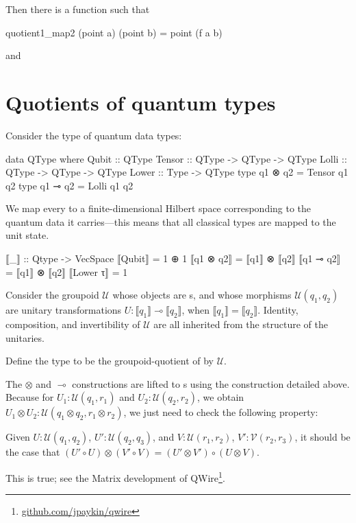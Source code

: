 \documentclass{article}
\begin{document}
Then there is a function  such that 
\begin{haskell}
    quotient1_map2 (point a) (point b) = point (f a b)
\end{haskell}
and 

\section{Quotients of quantum types}

Consider the type of quantum data types:
\begin{haskell}
data QType where
  Qubit  :: QType
  Tensor :: QType -> QType -> QType
  Lolli  :: QType -> QType -> QType
  Lower  :: Type -> QType
type q1 ⊗ q2 = Tensor q1 q2
type q1 ⊸ q2 = Lolli q1 q2
\end{haskell}

We map every  to a finite-dimensional Hilbert space corresponding
to the quantum data it carries---this means that all classical types are mapped
to the unit state.
\begin{haskell}
⟦_⟧ :: Qtype -> VecSpace
⟦Qubit⟧   = 1 ⊕ 1
⟦q1 ⊗ q2⟧ = ⟦q1⟧ ⊗ ⟦q2⟧
⟦q1 ⊸ q2⟧ = ⟦q1⟧ ⊗ ⟦q2⟧
⟦Lower τ⟧ = 1
\end{haskell}

Consider the groupoid $\mathcal{U}$ whose objects are s, and whose
morphisms $\mathcal{U}(q_1,q_2)$ are unitary transformations $U : ⟦q_1⟧ ⊸ ⟦q_2⟧$,
when $⟦q_1⟧=⟦q_2⟧$.  Identity,
composition, and invertibility of $\mathcal{U}$ are all inherited from the
structure of the unitaries.

Define the type  to be the groupoid-quotient of  by
$\mathcal{U}$.

The $⊗$ and $⊸$ constructions are lifted to s using the
 construction detailed above. Because
for $U_1 : \mathcal{U}(q_1,r_1)$ and $U_2 : \mathcal{U}(q_2,r_2)$,
we obtain $U_1 ⊗ U_2 : \mathcal{U}(q_1 ⊗ q_2, r_1 ⊗ r_2)$, we just need to check
the following property:

\begin{lemma}
    Given $U : \mathcal{U}(q_1,q_2)$, $U' : \mathcal{U}(q_2,q_3)$,
    and $V : \mathcal{U}(r_1,r_2)$, $V' : \mathcal{V}(r_2,r_3)$,
    it should be the case that
    $(U' ∘ U) ⊗ (V' ∘ V) = (U' ⊗ V') ∘ (U ⊗ V)$.
\end{lemma}
This is true; see the Matrix development of
QWire\footnote{\url{github.com/jpaykin/qwire}}.
\end{document}

